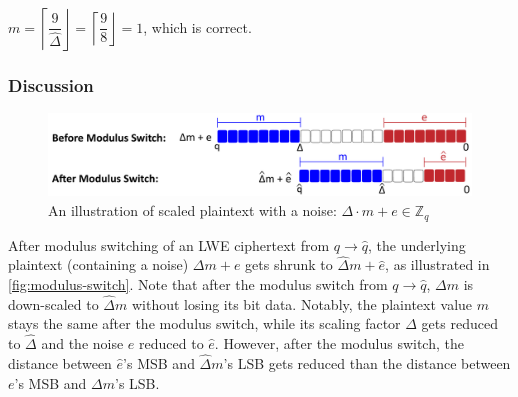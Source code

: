 $ $

$m = \left \lceil \dfrac{9}{\hat \Delta} \right \rfloor = \left \lceil \dfrac{9}{8} \right \rfloor = 1$, which is correct.


\subsubsection{Discussion}
\label{subsubsec:modulus-switch-lwe-discuss}

\begin{figure}[h!]
    \centering
  \includegraphics[width=0.7\linewidth]{figures/modulus-switching.pdf}
  \caption{An illustration of scaled plaintext with a noise: $\Delta \cdot m + e \in \mathbb{Z}_q$}
  \label{fig:modulus-switch}
\end{figure}

 After modulus switching of an LWE ciphertext from $q \rightarrow \hat{q}$, the underlying plaintext (containing a noise) $\Delta m + e$ gets shrunk to $\hat{\Delta}m + \hat{e}$, as illustrated in \autoref{fig:modulus-switch}. Note that after the modulus switch from $q \rightarrow \hat{q}$, $\Delta m$ is down-scaled to $\hat{\Delta} m$ without losing its bit data. Notably, the plaintext value $m$ stays the same after the modulus switch, while its scaling factor $\Delta$ gets reduced to $\hat{\Delta}$ and the noise $e$ reduced to $\hat e$. However, after the modulus switch, the distance between $\hat e$'s MSB and $\hat \Delta m$'s LSB gets reduced than the distance between $e$'s MSB and $\Delta m$'s LSB.




